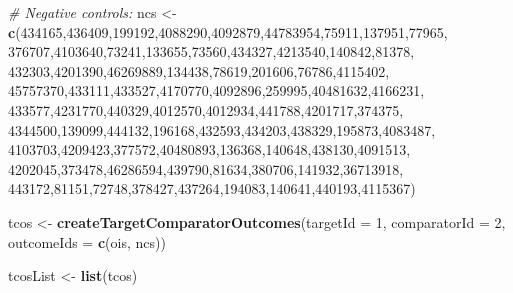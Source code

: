 \documentclass[10.5pt]{book}
\newenvironment{Shaded}{\begin{snugshade}}{\end{snugshade}}
\newcommand{\KeywordTok}[1]{\textcolor[rgb]{0.13,0.29,0.53}{\textbf{#1}}}
\newcommand{\DataTypeTok}[1]{\textcolor[rgb]{0.13,0.29,0.53}{#1}}
\newcommand{\DecValTok}[1]{\textcolor[rgb]{0.00,0.00,0.81}{#1}}
\newcommand{\StringTok}[1]{\textcolor[rgb]{0.31,0.60,0.02}{#1}}
\newcommand{\CommentTok}[1]{\textcolor[rgb]{0.56,0.35,0.01}{\textit{#1}}}
\newcommand{\NormalTok}[1]{#1}
\theoremstyle{definition}
\theoremstyle{definition}
\theoremstyle{definition}
\theoremstyle{remark}
\begin{document}
\begin{Shaded}
\begin{Highlighting}[]
\CommentTok{# Negative controls:}
\NormalTok{ncs <-}\StringTok{ }\KeywordTok{c}\NormalTok{(}\DecValTok{434165}\NormalTok{,}\DecValTok{436409}\NormalTok{,}\DecValTok{199192}\NormalTok{,}\DecValTok{4088290}\NormalTok{,}\DecValTok{4092879}\NormalTok{,}\DecValTok{44783954}\NormalTok{,}\DecValTok{75911}\NormalTok{,}\DecValTok{137951}\NormalTok{,}\DecValTok{77965}\NormalTok{,}
         \DecValTok{376707}\NormalTok{,}\DecValTok{4103640}\NormalTok{,}\DecValTok{73241}\NormalTok{,}\DecValTok{133655}\NormalTok{,}\DecValTok{73560}\NormalTok{,}\DecValTok{434327}\NormalTok{,}\DecValTok{4213540}\NormalTok{,}\DecValTok{140842}\NormalTok{,}\DecValTok{81378}\NormalTok{,}
         \DecValTok{432303}\NormalTok{,}\DecValTok{4201390}\NormalTok{,}\DecValTok{46269889}\NormalTok{,}\DecValTok{134438}\NormalTok{,}\DecValTok{78619}\NormalTok{,}\DecValTok{201606}\NormalTok{,}\DecValTok{76786}\NormalTok{,}\DecValTok{4115402}\NormalTok{,}
         \DecValTok{45757370}\NormalTok{,}\DecValTok{433111}\NormalTok{,}\DecValTok{433527}\NormalTok{,}\DecValTok{4170770}\NormalTok{,}\DecValTok{4092896}\NormalTok{,}\DecValTok{259995}\NormalTok{,}\DecValTok{40481632}\NormalTok{,}\DecValTok{4166231}\NormalTok{,}
         \DecValTok{433577}\NormalTok{,}\DecValTok{4231770}\NormalTok{,}\DecValTok{440329}\NormalTok{,}\DecValTok{4012570}\NormalTok{,}\DecValTok{4012934}\NormalTok{,}\DecValTok{441788}\NormalTok{,}\DecValTok{4201717}\NormalTok{,}\DecValTok{374375}\NormalTok{,}
         \DecValTok{4344500}\NormalTok{,}\DecValTok{139099}\NormalTok{,}\DecValTok{444132}\NormalTok{,}\DecValTok{196168}\NormalTok{,}\DecValTok{432593}\NormalTok{,}\DecValTok{434203}\NormalTok{,}\DecValTok{438329}\NormalTok{,}\DecValTok{195873}\NormalTok{,}\DecValTok{4083487}\NormalTok{,}
         \DecValTok{4103703}\NormalTok{,}\DecValTok{4209423}\NormalTok{,}\DecValTok{377572}\NormalTok{,}\DecValTok{40480893}\NormalTok{,}\DecValTok{136368}\NormalTok{,}\DecValTok{140648}\NormalTok{,}\DecValTok{438130}\NormalTok{,}\DecValTok{4091513}\NormalTok{,}
         \DecValTok{4202045}\NormalTok{,}\DecValTok{373478}\NormalTok{,}\DecValTok{46286594}\NormalTok{,}\DecValTok{439790}\NormalTok{,}\DecValTok{81634}\NormalTok{,}\DecValTok{380706}\NormalTok{,}\DecValTok{141932}\NormalTok{,}\DecValTok{36713918}\NormalTok{,}
         \DecValTok{443172}\NormalTok{,}\DecValTok{81151}\NormalTok{,}\DecValTok{72748}\NormalTok{,}\DecValTok{378427}\NormalTok{,}\DecValTok{437264}\NormalTok{,}\DecValTok{194083}\NormalTok{,}\DecValTok{140641}\NormalTok{,}\DecValTok{440193}\NormalTok{,}\DecValTok{4115367}\NormalTok{)}

\NormalTok{tcos <-}\StringTok{ }\KeywordTok{createTargetComparatorOutcomes}\NormalTok{(}\DataTypeTok{targetId =} \DecValTok{1}\NormalTok{,}
                                       \DataTypeTok{comparatorId =} \DecValTok{2}\NormalTok{,}
                                       \DataTypeTok{outcomeIds =} \KeywordTok{c}\NormalTok{(ois, ncs))}

\NormalTok{tcosList <-}\StringTok{ }\KeywordTok{list}\NormalTok{(tcos)}
\end{Highlighting}
\end{Shaded}
\end{document}
